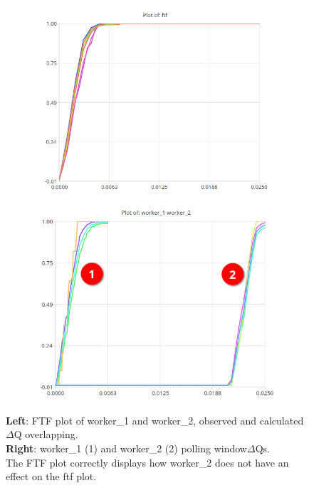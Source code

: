             \begin{figure}[H]
                \centering 
                \begin{subfigure}{.5\textwidth}
                    \centering
                    \includegraphics[width =0.98\textwidth]{img/ftf.png}
                    \label{fig:ftf_art_d}
                \end{subfigure}%
                \begin{subfigure}{.5\textwidth}%
                    \centering%
                    \includegraphics[width =0.98\textwidth]{img/delay32.png}%
                    \label{fig:ftf_art_dw}%
                \end{subfigure}%
                \caption{\textbf{Left}: FTF plot of worker\_1 and worker\_2, observed and calculated $\Delta$Q overlapping.\\
                \textbf{Right}: worker\_1 (1) and worker\_2 (2) polling window$\Delta$Qs. \\
                The FTF plot correctly displays how worker\_2 does not have an effect on the ftf plot.}
                \label{fig:ftf_w1w2}%
            \end{figure}%

